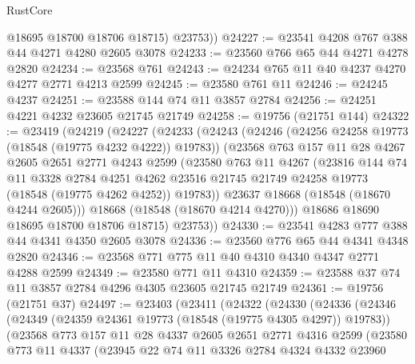 \begin{lexlean}{RustCore}
\begin{coremodule}
          @18695
          @18700
          @18706
          @18715)
        @23753))
@24227 := @23541 @4208 @767 @388 @44 @4271 @4280 @2605 @3078
@24233 := @23560 @766 @65 @44 @4271 @4278 @2820
@24234 := @23568 @761
@24243 := @24234 @765 @11 @40 @4237 @4270 @4277 @2771 @4213 @2599
@24245 := @23580 @761 @11
@24246 := @24245 @4237
@24251 := @23588 @144 @74 @11 @3857 @2784
@24256 := @24251 @4221 @4232 @23605 @21745 @21749
@24258 := @19756 (@21751 @144)
@24322 := @23419
    (@24219
      (@24227
        (@24233
          (@24243
            (@24246 (@24256 @24258 @19773 (@18548 (@19775 @4232 @4222)) @19783))
            (@23568
              @763
              @157
              @11
              @28
              @4267
              @2605
              @2651
              @2771
              @4243
              @2599
              (@23580
                @763
                @11
                @4267
                (@23816
                  @144
                  @74
                  @11
                  @3328
                  @2784
                  @4251
                  @4262
                  @23516
                  @21745
                  @21749
                  @24258
                  @19773
                  (@18548 (@19775 @4262 @4252))
                  @19783))
              @23637
              @18668
              (@18548 (@18670 @4244 @2605)))
            @18668
            (@18548 (@18670 @4214 @4270)))
          @18686
          @18690
          @18695
          @18700
          @18706
          @18715)
        @23753))
@24330 := @23541 @4283 @777 @388 @44 @4341 @4350 @2605 @3078
@24336 := @23560 @776 @65 @44 @4341 @4348 @2820
@24346 := @23568 @771 @775 @11 @40 @4310 @4340 @4347 @2771 @4288 @2599
@24349 := @23580 @771 @11 @4310
@24359 := @23588 @37 @74 @11 @3857 @2784 @4296 @4305 @23605 @21745 @21749
@24361 := @19756 (@21751 @37)
@24497 := @23403
    (@23411
      (@24322
        (@24330
          (@24336
            (@24346
              (@24349 (@24359 @24361 @19773 (@18548 (@19775 @4305 @4297)) @19783))
              (@23568
                @773
                @157
                @11
                @28
                @4337
                @2605
                @2651
                @2771
                @4316
                @2599
                (@23580
                  @773
                  @11
                  @4337
                  (@23945
                    @22
                    @74
                    @11
                    @3326
                    @2784
                    @4324
                    @4332
                    @23960

\end{coremodule}
\end{lexlean}
